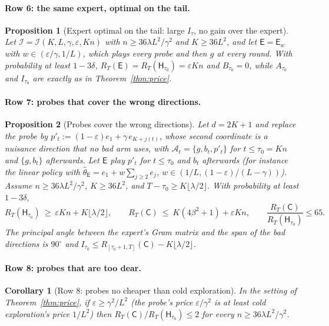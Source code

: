\documentclass{article}
\newtheorem{proposition}{Proposition}
\newtheorem{corollary}{Corollary}
\theoremstyle{definition}
\theoremstyle{remark}
\newcommand{\eps}{\varepsilon}
\theoremstyle{remark}
\newcommand{\Cold}{\mathsf{C}}
\newcommand{\Exp}{\mathsf{E}}
\newcommand{\Hyb}{\mathsf{H}}
\begin{document}
\paragraph{Row 6: the same expert, optimal on the tail.}
\begin{proposition}[Expert optimal on the tail: large $I_\tau$, no gain over the expert]
\label{prop:cat-tail}
Let $\mathcal I=\mathcal I(K,L,\gamma,\eps,Kn)$ with $n\ge36\lambda L^2/\gamma^2$ and
$K\ge36L^2$, and let $\Exp=\Exp_w$ with $w\in(\eps/\gamma,1/L)$, which plays every
probe and then $g$ at every round. With probability at least $1-3\delta$,
$R_T(\Exp)=R_T(\Hyb_{\tau_0})=\eps Kn$ and $B_{\tau_0}=0$, while $A_{\tau_0}$
and $I_{\tau_0}$ are exactly as in Theorem~\ref{thm:price}.
\end{proposition}

\paragraph{Row 7: probes that cover the wrong directions.}
\begin{proposition}[Probes cover the wrong directions]
\label{prop:cat-wrong}
Let $d=2K+1$ and replace the probe by
$p'_t:=(1-\eps)e_1+\gamma\,e_{K+j(t)}$, whose second coordinate is a nuisance
direction that no bad arm uses, with $\mathcal A_t=\{g,b_t,p'_t\}$ for
$t\le\tau_0=Kn$ and $\{g,b_t\}$ afterwards. Let $\Exp$ play $p'_t$ for
$t\le\tau_0$ and $b_t$ afterwards (for instance the linear policy with
$\widehat\theta_{\Exp}=e_1+w\sum_{j\ge2}e_j$, $w\in(1/L,(1-\eps)/(L-\gamma))$).
Assume $n\ge36\lambda L^2/\gamma^2$, $K\ge36L^2$, and $T-\tau_0\ge K\lfloor\lambda/2\rfloor$.
With probability at least $1-3\delta$,
\[
R_T(\Hyb_{\tau_0})\ \ge\ \eps Kn+K\lfloor\lambda/2\rfloor,
\qquad
R_T(\Cold)\ \le\ K(4\beta^2+1)+\eps Kn,
\qquad
\frac{R_T(\Cold)}{R_T(\Hyb_{\tau_0})}\le65 .
\]
The principal angle between the expert's Gram matrix and the span of the bad
directions is $90^\circ$ and $I_{\tau_0}\le R_{[\tau_0+1,T]}(\Cold)-K\lfloor\lambda/2\rfloor$.
\end{proposition}

\paragraph{Row 8: probes that are too dear.}
\begin{corollary}[Row 8: probes no cheaper than cold exploration]
\label{cor:cat-dear}
In the setting of Theorem~\ref{thm:price}, if $\eps\ge \gamma^2/L^2$ (the probe's
price $\eps/\gamma^2$ is at least cold exploration's price $1/L^2$) then
$R_T(\Cold)/R_T(\Hyb_{\tau_0})\le2$ for every $n\ge36\lambda L^2/\gamma^2$.
\end{corollary}
\end{document}
